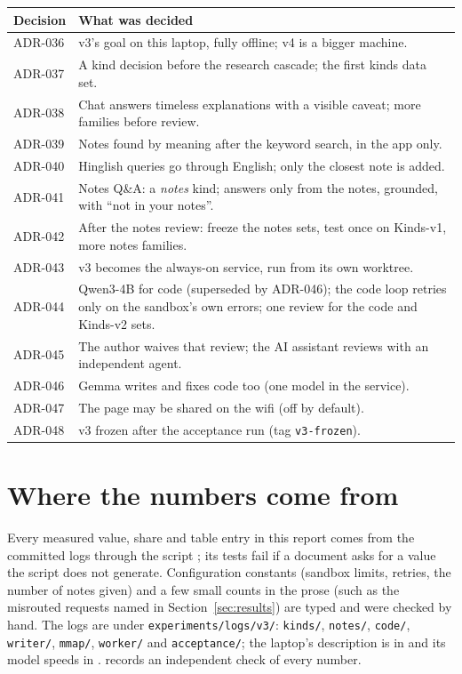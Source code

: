 \documentclass[11pt,a4paper]{article}
\begin{document}
\begin{small}
\begin{tabularx}{\textwidth}{@{}lX@{}}
\toprule
Decision & What was decided \\
\midrule
ADR-036 & v3's goal on this laptop, fully offline; v4 is a bigger machine. \\
ADR-037 & A kind decision before the research cascade; the first kinds data set. \\
ADR-038 & Chat answers timeless explanations with a visible caveat; more families before review. \\
ADR-039 & Notes found by meaning after the keyword search, in the app only. \\
ADR-040 & Hinglish queries go through English; only the closest note is added. \\
ADR-041 & Notes Q\&A: a \emph{notes} kind; answers only from the notes, grounded, with ``not in your notes''. \\
ADR-042 & After the notes review: freeze the notes sets, test once on Kinds-v1, more notes families. \\
ADR-043 & v3 becomes the always-on service, run from its own worktree. \\
ADR-044 & Qwen3-4B for code (superseded by ADR-046); the code loop retries only on the sandbox's own errors; one
review for the code and Kinds-v2 sets. \\
ADR-045 & The author waives that review; the AI assistant reviews with an independent agent. \\
ADR-046 & Gemma writes and fixes code too (one model in the service). \\
ADR-047 & The page may be shared on the wifi (off by default). \\
ADR-048 & v3 frozen after the acceptance run (tag \texttt{v3-frozen}). \\
\bottomrule
\end{tabularx}
\end{small}

\section{Where the numbers come from}
Every measured value, share and table entry in this report comes from the committed logs through the script
; its tests fail if a document asks for a value the script does not
generate. Configuration constants (sandbox limits, retries, the number of notes given) and a few small counts in the
prose (such as the misrouted requests named in Section~\ref{sec:results}) are typed and were checked by hand. The logs are under \texttt{experiments/logs/v3/}: \texttt{kinds/}, \texttt{notes/}, \texttt{code/},
\texttt{writer/}, \texttt{mmap/}, \texttt{worker/} and \texttt{acceptance/}; the laptop's description is in
 and its model speeds in .  records an
independent check of every number.
\end{document}
